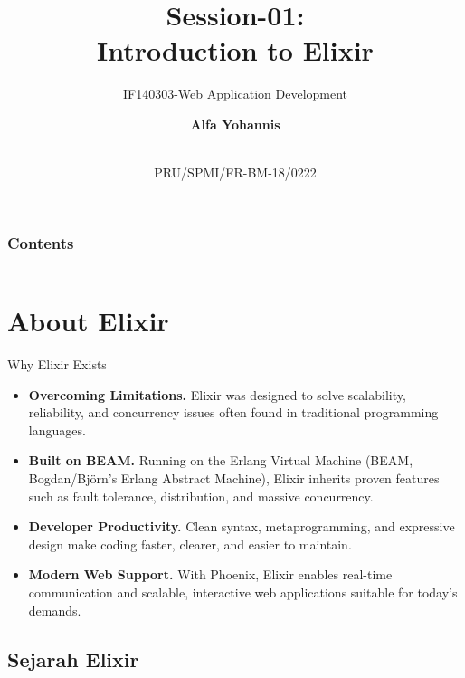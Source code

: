 \documentclass[aspectratio=169, table]{beamer}
\subtitle{IF140303-Web Application Development}
\title{Session-01:\\
\vspace{10pt}
\Huge{Introduction to Elixir}
}
\date[Serial]{\\\vspace{15pt}\scriptsize {PRU/SPMI/FR-BM-18/0222}}
\author[Pradita]{\small{\textbf{Alfa Yohannis}}}
\begin{document}
	
	\frame{\titlepage}


	\begin{frame}[fragile]
		\frametitle{Contents}
		\vspace{20pt}
		\begin{columns}[t]
			\tableofcontents[sections={1-5}]
			
			\tableofcontents[sections={6-20}]
		\end{columns}
	\end{frame}

\section{About Elixir}

\begin{frame}{Why Elixir Exists}
	\vspace{20pt}
	\begin{itemize}
		\item \textbf{Overcoming Limitations.} Elixir was designed to solve scalability, reliability, and concurrency issues often found in traditional programming languages.  
		\item \textbf{Built on BEAM.} Running on the Erlang Virtual Machine (BEAM, Bogdan/Björn’s Erlang Abstract Machine), Elixir inherits proven features such as fault tolerance, distribution, and massive concurrency.  
		\item \textbf{Developer Productivity.} Clean syntax, metaprogramming, and expressive design make coding faster, clearer, and easier to maintain.  
		\item \textbf{Modern Web Support.} With Phoenix, Elixir enables real-time communication and scalable, interactive web applications suitable for today’s demands.  
	\end{itemize}
\end{frame}

\subsection{Sejarah Elixir}
\end{document}
